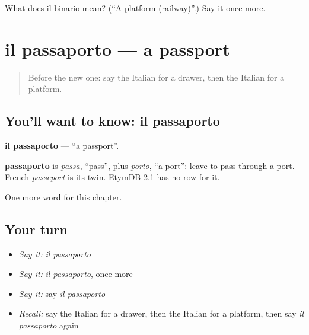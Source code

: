 \begin{tcolorbox}[breakable,colback=teal!4,colframe=teal!35!black,title={Before you move on}]
What does il binario mean? (\textquotedblleft{}A platform (railway)\textquotedblright{}.) Say it once more.
\end{tcolorbox}
\section[il passaporto]{il passaporto — a passport}

\label{lesson:IT-C192-passaporto}



\begin{quote}
Before the new one: say the Italian for a drawer, then the Italian for a platform.
\end{quote}

\subsection*{You'll want to know: il passaporto}
\textbf{il passaporto} — \textquotedblleft{}a passport\textquotedblright{}.

\begin{cousinweb}
\textbf{passaporto} is \emph{passa}, \textquotedblleft{}pass\textquotedblright{}, plus \emph{porto}, \textquotedblleft{}a port\textquotedblright{}: leave to pass through a port. French \emph{passeport} is its twin. EtymDB 2.1 has no row for it.
\end{cousinweb}

\begin{grammarlens}[title={What you've built}]
One more word for this chapter.
\end{grammarlens}

\subsection*{Your turn}
\begin{itemize}
\raggedright
  \item \emph{Say it:} \emph{il passaporto}
  \item \emph{Say it:} \emph{il passaporto}, once more
  \item \emph{Say it:} say \emph{il passaporto}
  \item \emph{Recall:} say the Italian for a drawer, then the Italian for a platform, then say \emph{il passaporto} again
\end{itemize}

